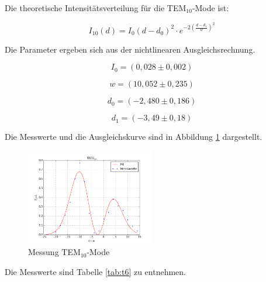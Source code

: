 \noindent Die theoretische Intensitätsverteilung für die TEM\(_{10}\)-Mode ist:

\begin{equation}
I_{10}(d)=I_0(d-d_0)^2\cdot e^{-2\left(\frac{d-d_1}{w}\right)^2}
\end{equation}

\noindent Die Parameter ergeben sich aus der nichtlinearen Ausgleichsrechnung.

\begin{equation*}
I_0=(0,028\pm0,002)
\end{equation*}

\begin{equation*}
w=(10,052\pm0,235)
\end{equation*}

\begin{equation*}
d_0=(-2,480\pm0,186)
\end{equation*}

\begin{equation*}
d_1=(-3,49\pm0,18)
\end{equation*}

\noindent Die Messwerte und die Ausgleichskurve sind in Abbildung \ref{fig:TEM10} dargestellt. 

\begin{figure}[H]
	\centering
	\includegraphics[width=0.5\textwidth]{plots/TEM10}
	\caption{Messung TEM\(_{10}\)-Mode}
	\label{fig:TEM10}
\end{figure}

\noindent Die Messwerte sind Tabelle \ref{tab:t6} zu entnehmen.

